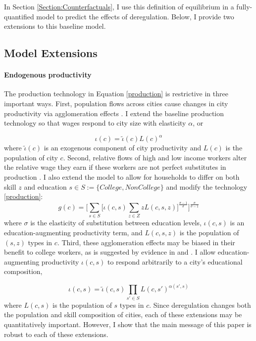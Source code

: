 \documentclass[12pt]{article}
\begin{document}
	\noindent In Section \ref{Section:Counterfactuals}, I use this definition of equilibrium in a fully-quantified model to predict the effects of deregulation. Below, I provide two extensions to this baseline model. 
	
	\subsection{Model Extensions}
	
	\paragraph*{Endogenous productivity} The production technology in Equation \eqref{production} is restrictive in three important ways. First, population flows across cities cause changes in city productivity via agglomeration effects \citep{Combes_review}. I extend the baseline production technology so that wages respond to city size with elasticity $\alpha$, or 
	
	\begin{equation}\label{endoprod}
		\iota(c) = \tilde{\iota}(c)L(c)^{\alpha}
	\end{equation}
	where $\tilde{\iota}(c)$ is an exogenous component of city productivity and $L(c)$ is the population of city $c$. Second, relative flows of high and low income workers alter the relative wage they earn if these workers are not perfect substitutes in production \citep{card}. I also extend the model to allow for households to differ on both skill $z$ and education $s \in S:= \{College, NonCollege\}$ and modify the technology \eqref{production}:
	\begin{equation}\label{prod_byskill}
		g(c) = \bigg[\sum_{s \in S}\big[\iota(c, s)\sum_{z \in Z}zL(c, s, z)\big]^{\frac{\sigma - 1}{\sigma}} \bigg]^{\frac{\sigma}{\sigma - 1}}
 	\end{equation}
	where $\sigma$ is the elasticity of substitution between education levels, $\iota(c, s)$ is an education-augmenting productivity term, and $L(c, s, z)$ is the population of $(s, z)$ types in $c$. Third, these agglomeration effects may be biased in their benefit to college workers, as is suggested by evidence in \cite{diamond2016} and \cite{ineqincreased}. I allow education-augmenting productivity $\iota(c, s)$ to respond arbitrarily to a city's educational composition,
	
	\begin{equation}\label{endoprod_byskill}
		\iota(c, s) = \tilde{\iota}(c, s)\prod_{s' \in S}L(c, s')^{\alpha(s', s)}
	\end{equation} where $L(c, s)$ is the population of $s$ types in $c$. Since deregulation changes both the population and skill composition of cities, each of these extensions may be quantitatively important. However, I show that the main message of this paper is robust to each of these extensions. 
	
\end{document}

